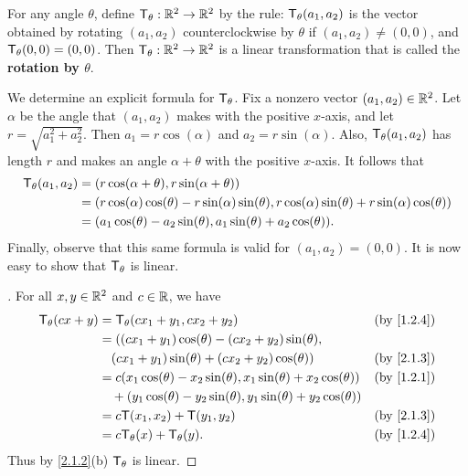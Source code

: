\begin{eg}\label{2.1.3}
  For any angle \(\theta\), define \(\mathsf{T}_{\theta} : \mathbb{R}^2 \to \mathbb{R}^2\) by the rule: \(\mathsf{T}_{\theta}(a_1, a_2)\) is the vector obtained by rotating \((a_1, a_2)\) counterclockwise by \(\theta\) if \((a_1, a_2) \neq (0, 0)\), and \(\mathsf{T}_{\theta}(0, 0) = (0, 0)\).
  Then \(\mathsf{T}_{\theta} : \mathbb{R}^2 \to \mathbb{R}^2\) is a linear transformation that is called the \textbf{rotation by \(\theta\)}.

  We determine an explicit formula for \(\mathsf{T}_{\theta}\).
  Fix a nonzero vector \((a_1, a_2) \in \mathbb{R}^2\).
  Let \(\alpha\) be the angle that \((a_1, a_2)\) makes with the positive \(x\)-axis, and let \(r = \sqrt{a_1^2 +a_2^2}\).
  Then \(a_1 = r \cos(\alpha)\) and \(a_2 = r \sin(\alpha)\).
  Also, \(\mathsf{T}_{\theta}(a_1, a_2)\) has length \(r\) and makes an angle \(\alpha + \theta\) with the positive \(x\)-axis.
  It follows that
  \begin{align*}
    \mathsf{T}_{\theta}(a_1, a_2) & = (r \cos(\alpha + \theta), r \sin(\alpha + \theta))                                                                     \\
                          & = (r \cos(\alpha) \cos(\theta) - r \sin(\alpha) \sin(\theta), r \cos(\alpha) \sin(\theta) + r \sin(\alpha) \cos(\theta)) \\
                          & = (a_1 \cos(\theta) - a_2 \sin(\theta), a_1 \sin(\theta) + a_2 \cos(\theta)).
  \end{align*}
  Finally, observe that this same formula is valid for \((a_1 ,a_2) = (0, 0)\).
  It is now easy to show that \(\mathsf{T}_{\theta}\) is linear.
\end{eg}

\begin{proof}[]
  For all \(x, y \in \mathbb{R}^2\) and \(c \in \mathbb{R}\), we have
  \begin{align*}
    \T_{\theta}(cx + y) & = \T_{\theta}(cx_1 + y_1, cx_2 + y_2)                                              &  & \by{1.2.4} \\
                        & = ((cx_1 + y_1) \cos(\theta) - (cx_2 + y_2)\sin(\theta),                                           \\
                        & \quad (cx_1 + y_1) \sin(\theta) + (cx_2 + y_2) \cos(\theta))                       &  & \by{2.1.3} \\
                        & = c (x_1 \cos(\theta) - x_2 \sin(\theta), x_1 \sin(\theta) + x_2 \cos(\theta))     &  & \by{1.2.1} \\
                        & \quad + (y_1 \cos(\theta) - y_2 \sin(\theta), y_1 \sin(\theta) + y_2 \cos(\theta))                 \\
                        & = c\T(x_1, x_2) + \T(y_1, y_2)                                                     &  & \by{2.1.3} \\
                        & = c\T_{\theta}(x) + \T_{\theta}(y).                                                &  & \by{1.2.4}
  \end{align*}
  Thus by \cref{2.1.2}(b) \(\mathsf{T}_{\theta}\) is linear.
\end{proof}

